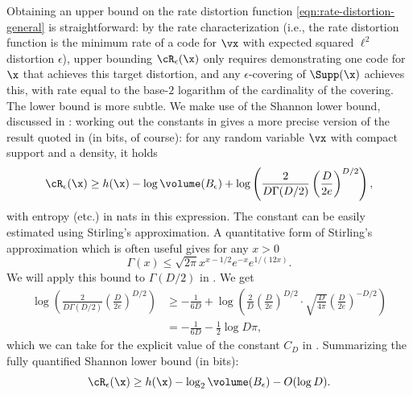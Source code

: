 \documentclass[../../book-main.tex]{subfiles}
\begin{document}
Obtaining an upper bound on the rate distortion function
\eqref{eqn:rate-distortion-general} is straightforward: by the rate
characterization (i.e., the rate distortion function is the minimum rate of
a code for $\vx$ with expected squared $\ell^2$ distortion $\epsilon$), upper
bounding $\cR_{\epsilon}(\x)$ only requires demonstrating one code for $\x$ that
achieves this target distortion, and any $\epsilon$-covering of $\Supp(\x)$
achieves this, with rate equal to the base-$2$ logarithm of the cardinality of
the covering.
The lower bound is more subtle. We make use of the Shannon lower bound,
discussed in : working out the constants in \cite[\S III,
(22)]{Linder1994-ej} gives a more precise version of the result quoted in
 (in bits, of course): for any random variable $\vx$ with compact
support and a density, it holds
\begin{equation}\label{eq:slb-appendix-1}
    \cR_{\epsilon}(\x)
    \geq
    h(\x)
    - \log \volume(B_{\epsilon})
    +
    \log
    \left(
        \frac{
            2
        }
        {
            D \Gamma(D/2)
        }
        \left(
            \frac{
                D
            }
            {
                2e
            }
        \right)^{D/2}
    \right),
\end{equation}
with entropy (etc.) in nats in this expression.
The constant can be easily estimated using Stirling's approximation.
A quantitative form of Stirling's approximation which is often useful gives
for any $x > 0$ \cite{Jameson2015-hy}
\begin{equation}
    \Gamma(x) \leq \sqrt{2\pi} x^{x - 1/2} e^{-x} e^{1/(12x)}.
\end{equation}
We will apply this bound to $\Gamma(D/2)$ in .
We get
\begin{align}
    \log
    \left(
        \frac{
            2
        }
        {
            D \Gamma(D/2)
        }
        \left(
            \frac{
                D
            }
            {
                2e
            }
        \right)^{D/2}
    \right)
    &\geq
    -\frac{1}{6D}
    +
    \log\left(
        \frac{2}{D}
        \left(
            \frac{
                D
            }
            {
                2e
            }
        \right)^{D/2}
        \cdot
        \sqrt{\frac{D}{4\pi}}
        \left(
            \frac{D}{2e}
        \right)^{-D/2}
    \right)
    \\
    &=
    -\frac{1}{6D}
    - \frac{1}{2}\log D\pi,\label{eq:slb-constant-est}
\end{align}
which we can take for the explicit value of the constant $C_D$ in .
Summarizing the fully quantified Shannon lower bound (in bits):
\begin{equation}\label{eq:slb-appendix}
    \cR_{\epsilon}(\x)
    \geq
    h(\x)
    - \log_2 \volume(B_{\epsilon})
    - O(\log D).
\end{equation}
\end{document}
